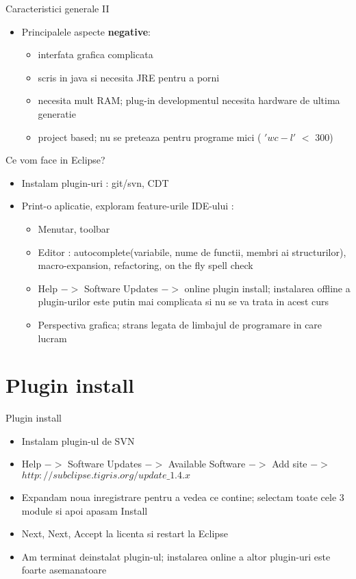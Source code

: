 \documentclass{beamer}
\begin{document}
\begin{frame}{Caracteristici generale II}
  \begin{itemize}
    \item Principalele aspecte \textbf{negative}:
    \begin{itemize}
      \item interfata grafica complicata
      \item scris in java si necesita JRE pentru a porni
      \item necesita mult RAM; plug-in developmentul necesita hardware de ultima generatie
      \item project based; nu se preteaza pentru programe mici ( ${'wc -l'}$ $<$ 300)
    \end{itemize}
  \end{itemize}
\end{frame}

\begin{frame}{Ce vom face in Eclipse?}
  \begin{itemize}
  \item Instalam plugin-uri : git/svn, CDT
  \item Print-o aplicatie, exploram feature-urile IDE-ului :
    \begin{itemize}
      \item Menutar, toolbar
      \item Editor : autocomplete(variabile, nume de functii, membri ai structurilor), macro-expansion, refactoring, on the fly spell check
      \item Help $->$ Software Updates $->$ online plugin install; instalarea offline a plugin-urilor este putin mai complicata si nu se va trata in acest curs
      \item Perspectiva grafica; strans legata de limbajul de programare in care lucram
    \end{itemize}
  \end{itemize}
\end{frame}

\section{Plugin install}
\frame{\tableofcontents[currentsection]}

\begin{frame}{Plugin install}
\begin{itemize}
  \item Instalam plugin-ul de SVN
  \item Help $->$ Software Updates $->$ Available Software $->$ Add site $->$ $http://subclipse.tigris.org/update\_1.4.x$
  \item Expandam noua inregistrare pentru a vedea ce contine; selectam toate cele 3 module si apoi apasam Install
  \item Next, Next, Accept la licenta si restart la Eclipse
  \item Am terminat deinstalat plugin-ul; instalarea online a altor plugin-uri este foarte asemanatoare
\end{itemize}
\end{frame}
\end{document}
